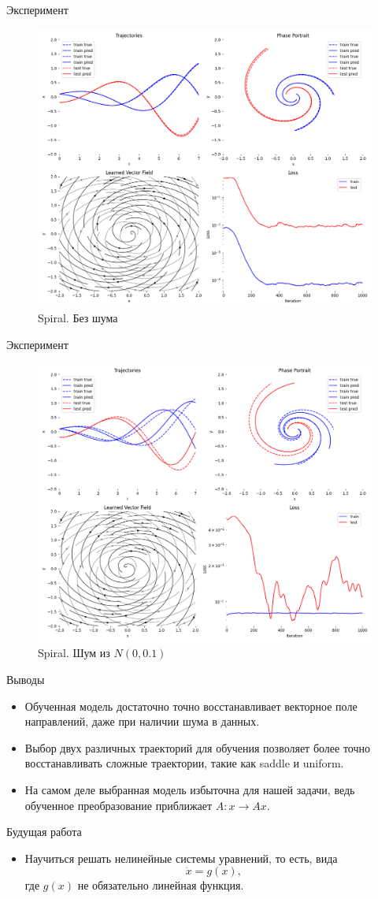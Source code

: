 \documentclass{beamer}
\begin{document}
\begin{frame}{Эксперимент}
\begin{figure}
 \centering
 \includegraphics[width=0.8\linewidth]{spiral-0.0}
 \caption{Spiral. Без шума}
\end{figure}
\end{frame}

\begin{frame}{Эксперимент}
\begin{figure}
 \centering
 \includegraphics[width=0.8\linewidth]{spiral-0.1}
 \caption{Spiral. Шум из $N(0, 0.1)$}
\end{figure}
\end{frame}

\begin{frame}{Выводы}
 \begin{itemize}
  \item Обученная модель достаточно точно восстанавливает векторное поле направлений, даже при наличии шума в данных.
  \item Выбор двух различных траекторий для обучения позволяет более точно восстанавливать сложные траектории, такие как saddle и uniform.
  \item На самом деле выбранная модель избыточна для нашей задачи, ведь обученное преобразование приближает $A: x \to Ax$.
 \end{itemize}
\end{frame}

\begin{frame}{Будущая работа}
 \begin{itemize}
  \item Научиться решать нелинейные системы уравнений, то есть, вида
  $$\dot{x} = g(x),$$
  где $g(x)$ не обязательно линейная функция.
 \end{itemize}
\end{frame}
\end{document}
